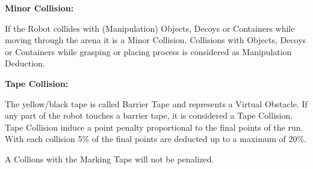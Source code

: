 \textbf{Minor Collision:}

If the Robot collides with (Manipulation) Objects, Decoys or Containers while moving through the arena it is a Minor Collision. Collisions with Objects, Decoys or Containers while grasping or placing process is considered as Manipulation Deduction.


\textbf{Tape Collision:}

The yellow/black tape is called Barrier Tape and represents a Virtual Obstacle. If any part of the robot
touches a barrier tape, it is considered a Tape Collision. Tape Collision induce a point penalty
proportional to the final points of the run. With each collision 5\% of the final points are deducted up to a maximum
of 20\%. 

A Collions with the Marking Tape will not be penalized.


